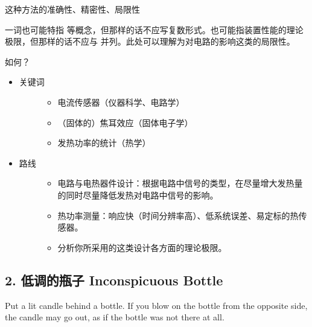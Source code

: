 \documentclass[a4paper,10pt,english]{sphinxmanual}
\begin{document}
这种方法的准确性、精密性、局限性 %
\begin{footnote}[1]\sphinxAtStartFootnote
{} 一词也可能特指  等概念，但那样的话不应写复数形式。也可能指装置性能的理论极限，但那样的话不应与  并列。此处可以理解为对电路的影响这类的局限性。
%
\end{footnote} 如何？
\begin{itemize}
\item {} \begin{description}
\item[{关键词}] \leavevmode\begin{itemize}
\item {} 
电流传感器（仪器科学、电路学）

\item {} 
（固体的）焦耳效应（固体电子学）

\item {} 
发热功率的统计（热学）

\end{itemize}

\end{description}

\item {} \begin{description}
\item[{路线}] \leavevmode\begin{itemize}
\item {} 
电路与电热器件设计：根据电路中信号的类型，在尽量增大发热量的同时尽量降低发热对电路中信号的影响。

\item {} 
热功率测量：响应快（时间分辨率高）、低系统误差、易定标的热传感器。

\item {} 
分析你所采用的这类设计各方面的理论极限。

\end{itemize}

\end{description}

\end{itemize}


\subsection{2. 低调的瓶子 Inconspicuous Bottle}
\label{\detokenize{8. Appendix:inconspicuous-bottle}}
Put a lit candle behind a bottle. If you blow on the bottle from the opposite side, the candle may go out, as if the bottle was not there at all.
\end{document}
